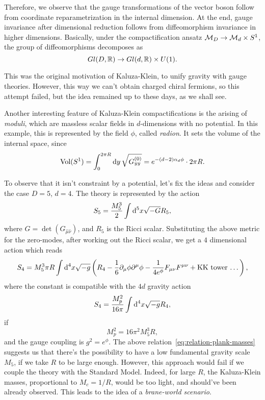 Therefore, we observe that the gauge transformations of the vector boson follow from coordinate reparametrization in the internal dimension. At the end, gauge invariance after dimensional reduction follows from diffeomorphism invariance in higher dimensions. Basically, under the compactification ansatz $\mathcal{M}_D \to \mathcal{M}_d \times S^1$, the group of diffeomorphisms decomposes as
\begin{equation}
    Gl(D, \mathbb{R}) \to Gl(d,\mathbb{R}) \times U(1).
\end{equation}

This was the original motivation of Kaluza-Klein, to unify gravity with gauge theories. However, this way we can't obtain charged chiral fermions, so this attempt failed, but the idea remained up to these days, as we shall see.

Another interesting feature of Kaluza-Klein compactifications is the arising of \emph{moduli}, which are massless scalar fields in $d$-dimensions with no potential. In this example, this is represented by the field $\phi$, called \emph{radion}. It sets the volume of the internal space, since
\begin{equation}\label{eq:radion-and-radius}
    \textup{Vol} (S^1)  = \int_{0}^{2\pi R} \mathop{}\!\mathrm{d} y \, \sqrt{G^{(0)}_{yy}} = e^{-(d-2)\alpha_d \phi} \cdot 2\pi R .
\end{equation}

To observe that it isn't constraint by a potential, let's fix the ideas and consider the case $D=5$, $d=4$. The theory is represented by the action
\begin{equation}
    S_5 = \frac{M^3_5}{2} \int \mathop{}\!\mathrm{d}^5 x \sqrt{-G} R_5,
\end{equation}
where $G = \det(G_{\hat{\mu} \hat{\nu}})$, and $R_5$ is the Ricci scalar. Substituting the above metric for the zero-modes, after working out the Ricci scalar, we get a $4$ dimensional action which reads
\begin{equation}
    S_4 = M^3_5 \pi R \int {\mathop{}\!\mathrm{d}}^4 x \sqrt{-g} \left( R_4 -\frac{1}{6} \partial_\mu \phi \partial^\mu \phi - \frac{1}{4 e^\phi} F_{\mu\nu} F^{\mu\nu} + \textup{KK tower \dots} \right),
\end{equation}
where the constant is compatible with the $4d$ gravity action
\begin{equation}
    S_4 = \frac{M^2_p}{16\pi} \int {\mathop{}\!\mathrm{d}}^4 x \sqrt{-g} R_4 ,
\end{equation}
if
\begin{equation}\label{eq:relation-plank-masses}
    M^2_p = 16 \pi^2 M^3_5 R,
\end{equation}
and the gauge coupling is $g^2 = e^\phi$. The above relation~\eqref{eq:relation-plank-masses} suggests us that there's the possibility to have a low fundamental gravity scale $M_5$, if we take $R$ to be large enough. However, this approach would fail if we couple the theory with the Standard Model. Indeed, for large $R$, the Kaluza-Klein masses, proportional to $M_c = 1/R$, would be too light, and should've been already observed. This leads to the idea of a \emph{brane-world scenario}.

